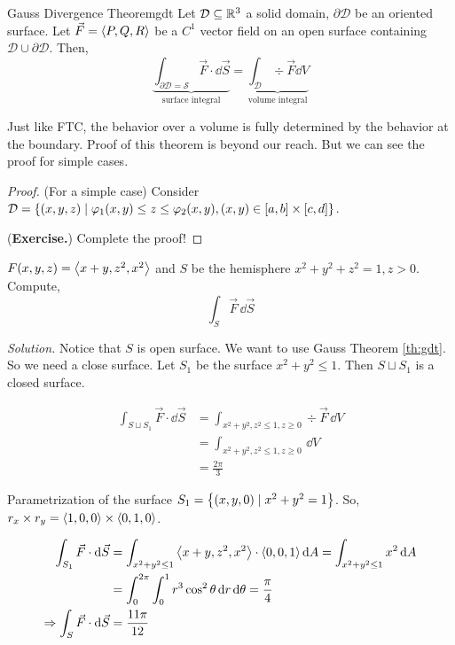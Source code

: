 \documentclass[../Analysis-3.tex]{subfiles}
\begin{document}
\begin{Thm}{Gauss Divergence Theorem}{gdt}
  Let $\mathcal{D} \subseteq \mathbb{R}^3$ a solid domain, $\partial{\mathcal{D}}$ be an oriented surface. Let $\vec{F} = \left\langle {P}, {Q,R} \right\rangle$ be a $C^1$ vector field on an open surface containing $\mathcal{D} \cup \partial{\mathcal{D}}$. Then,
  \[
    \underbrace{\int_{\partial{\mathcal{D}} = \mathcal{S}} \vec{F}\cdot \dd{\vec{S}}}_\text{surface integral} = \underbrace{\int_{\mathcal{D}} \div \vec{F} \dd{V}}_\text{volume integral}
  \]
\end{Thm}

Just like FTC, the behavior over a volume is fully determined by the behavior at the boundary. Proof of this theorem is beyond our reach. But we can see the proof for simple cases.

\begin{proof}
  (For a simple case) Consider $\mathcal{D} = \qty{(x,y,z) \mid \varphi_1(x,y) \leq z \leq \varphi_2(x,y), (x,y) \in [a,b]\times [c,d]}$.

  (\textbf{Exercise.}) Complete the proof!
\end{proof}


\begin{Eg}{}{}
  $F (x,y,z) = \left\langle {x+y}, {z^2,x^2} \right\rangle$ and $S$ be the hemisphere $x^2+y^2+z^2 = 1, z>0$. Compute,
  \[\int_{S} \vec{F} \, \dd \vec{S}\]

  \textit{Solution.} Notice that $S$ is open surface. We want to  use Gauss Theorem \ref{th:gdt}. So we need a close surface. Let $S_1$ be the surface $x^2 +y^2 \leq 1$. Then $S \sqcup S_1$ is a closed surface.

  \begin{align*}
    \int_{S \sqcup S_1} \vec{F}\cdot \dd \vec{S}
     & = \int_{x^2+y^2,z^2 \leq 1, z \ge 0} \div \vec{F} \, \dd{V} \\
     & = \int_{x^2+y^2,z^2 \leq 1, z \ge 0}\,\dd{V}                \\
     & = \frac{2\pi}{3}
  \end{align*}

  Parametrization of the surface $S_1 =\qty{(x,y,0) \mid x^2+y^2 = 1}$. So, $r_x \times r_y = \left\langle {1,0}, {0} \right\rangle \times \left\langle {0,1}, {0} \right\rangle$.

  \begin{align*}
    \int_{S_1} \vec{F} \cdot \dd \vec{S}
     & = \int_{x^2+y^2 \leq 1} \left\langle {x+y}, {z^2,x^2} \right\rangle \cdot \left\langle {0,0}, {1} \right\rangle \dd{A} = \int_{x^2+y^2 \leq 1} x^2 \dd{A} \\
     & = \int_{0}^{2\pi} \int_{0}^{1} r^3 \cos^2 \theta \, \dd r \, \dd\theta = \frac{\pi}{4}                  \\
    \Rightarrow \int_{S} \vec{F} \cdot \dd \vec{S}
     & = \frac{11\pi}{12}
  \end{align*}
\end{Eg}
\end{document}
